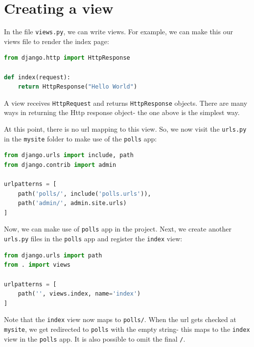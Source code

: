 \documentclass[a4paper, openany]{memoir}
\begin{document}
    \section{Creating a view}
    In the file \texttt{views.py}, we can write views. For example, we can make this our views file to render the index page:
\begin{lstlisting}[language=python]
from django.http import HttpResponse

def index(request):
    return HttpResponse("Hello World")
\end{lstlisting}
    A view receives \texttt{HttpRequest} and returns \texttt{HttpResponse} objects. There are many ways in returning the Http response object- the one above is the simplest way.

    At this point, there is no url mapping to this view. So, we now visit the \texttt{urls.py} in the \texttt{mysite} folder to make use of the \texttt{polls} app:
\begin{lstlisting}[language=python]
from django.urls import include, path
from django.contrib import admin

urlpatterns = [
    path('polls/', include('polls.urls')),
    path('admin/', admin.site.urls)
]
\end{lstlisting}
Now, we can make use of \texttt{polls} app in the project. Next, we create another \texttt{urls.py} files in the \texttt{polls} app and register the \texttt{index} view:
\begin{lstlisting}[language=python]
from django.urls import path
from . import views

urlpatterns = [
    path('', views.index, name='index')
]
\end{lstlisting}
    Note that the \texttt{index} view now maps to \texttt{polls/}. When the url gets checked at \texttt{mysite}, we get redirected to \texttt{polls} with the empty string- this maps to the \texttt{index} view in the \texttt{polls} app. It is also possible to omit the final \texttt{/}. 
\end{document}
